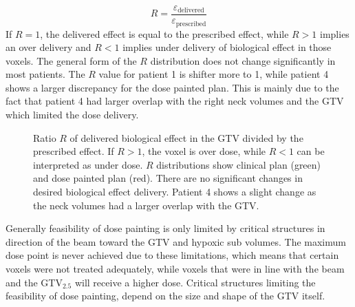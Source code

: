 \begin{equation}
R = \frac{\varepsilon_\mathrm{delivered}}{\varepsilon_\mathrm{prescribed}}
\end{equation}
If $R=1$, the delivered effect is equal to the prescribed effect, while $R>1$ implies an over delivery and $R<1$ implies under delivery of biological effect in those voxels. The general form of the $R$ distribution does not change significantly in most patients. The $R$ value for patient 1 is shifter more to 1, while patient 4 shows a larger discrepancy for the dose painted plan. This is mainly due to the fact that patient 4 had larger overlap with the right neck volumes and the GTV which limited the dose delivery.
\begin{sidewaysfigure}[p]
\centering
{}
\caption{Ratio $R$ of delivered biological effect in the GTV divided by the prescribed effect. If $R>1$, the voxel is over dose, while $R<1$ can be interpreted as under dose. $R$ distributions show clinical plan (green) and dose painted plan (red). There are no significant changes in desired biological effect delivery. Patient 4 shows a slight change as the neck volumes had a larger overlap with the GTV.}
\label{fig:R}
\end{sidewaysfigure}
Generally feasibility of dose painting is only limited by critical structures in direction of the beam toward the GTV and hypoxic sub volumes. The maximum dose point is never achieved due to these limitations, which means that certain voxels were not treated adequately, while voxels that were in line with the beam and the GTV$_{2.5}$ will receive a higher dose. Critical structures limiting the feasibility of dose painting, depend on the size and shape of the GTV itself.
